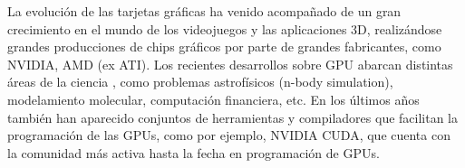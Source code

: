 La evolución de las tarjetas gráficas ha venido acompañado de un gran crecimiento en el mundo de los videojuegos y las aplicaciones 3D, realizándose grandes
producciones de chips gráficos por parte de grandes fabricantes, como NVIDIA, AMD (ex ATI). Los recientes desarrollos sobre GPU abarcan distintas áreas de la ciencia \cite{kirk2010programming},
como problemas astrofísicos (n-body simulation), modelamiento molecular, computación financiera, etc. En los últimos años también han aparecido 
conjuntos de herramientas y compiladores que facilitan la programación de las GPUs, como por ejemplo, NVIDIA CUDA, que cuenta con la comunidad más activa hasta 
la fecha en programación de GPUs.

%
%
%
